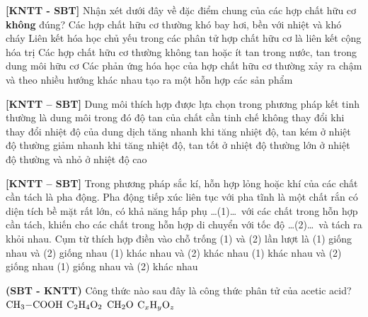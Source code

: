 \documentclass[12pt,a4paper]{article}
\begin{document}
\begin{ex}
\textbf{[KNTT - SBT]} Nhận xét dưới đây về đặc điểm chung của các hợp chất hữu cơ \textbf{không} đúng?
\choice
{\True Các hợp chất hữu cơ thường khó bay hơi, bền với nhiệt và khó cháy}
{Liên kết hóa học chủ yếu trong các phân tử hợp chất hữu cơ là liên kết cộng hóa trị}
{Các hợp chất hữu cơ thường không tan hoặc ít tan trong nước, tan trong dung môi hữu cơ}
{Các phản ứng hóa học của hợp chất hữu cơ thường xảy ra chậm và theo nhiều hướng khác nhau tạo ra một hỗn hợp các sản phẩm}

\end{ex}

\begin{ex}
\textbf{[KNTT – SBT]} Dung môi thích hợp được lựa chọn trong phương pháp kết tinh thường là dung môi trong đó độ tan của chất cần tinh chế
\choice
{không thay đổi khi thay đổi nhiệt độ của dung dịch}
{\True tăng nhanh khi tăng nhiệt độ, tan kém ở nhiệt độ thường}
{giảm nhanh khi tăng nhiệt độ, tan tốt ở nhiệt độ thường}
{lớn ở nhiệt độ thường và nhỏ ở nhiệt độ cao}

\end{ex}

\begin{ex}
\textbf{[KNTT – SBT]} Trong phương pháp sắc kí, hỗn hợp lỏng hoặc khí của các chất cần tách là pha động. Pha động tiếp xúc liên tục với pha tĩnh là một chất rắn có diện tích bề mặt rất lớn, có khả năng hấp phụ \dots(1)\dots\ với các chất trong hỗn hợp cần tách, khiến cho các chất trong hỗn hợp di chuyển với tốc độ \dots(2)\dots\ và tách ra khỏi nhau. Cụm từ thích hợp điền vào chỗ trống (1) và (2) lần lượt là
\choice
{(1) giống nhau và (2) giống nhau}
{\True (1) khác nhau và (2) khác nhau}
{(1) khác nhau và (2) giống nhau}
{(1) giống nhau và (2) khác nhau}

\end{ex}

\begin{ex}
\textbf{(SBT - KNTT)} Công thức nào sau đây là công thức phân tử của acetic acid?
\choice
{$\ce{CH3-COOH}$}
{\True $\ce{C2H4O2}$}
{$\ce{CH2O}$}
{$\ce{C_xH_yO_z}$}

\end{ex}
\end{document}
